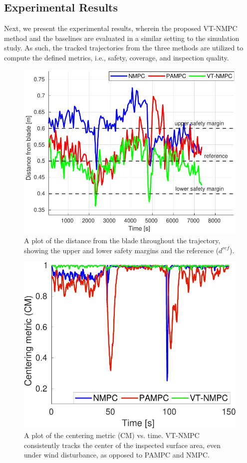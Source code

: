 \subsection{Experimental Results}

Next, we present the experimental results, wherein the proposed VT-NMPC method and the baselines are evaluated in a similar setting to the simulation study. As such, the tracked trajectories from the three methods are utilized to compute the defined metrics, i.e., safety, coverage, and inspection quality. 



\begin{figure}[]
\centering
\includegraphics[width=.45\textwidth]{figures/distance_real.pdf}
\caption{A plot of the distance from the blade throughout the trajectory, showing the upper and lower safety margins and the reference ($d^{ref}$). }  \label{fig:distance_r}
\end{figure}


\begin{figure}[]
\centering
\includegraphics[width=.45\textwidth]{figures/cm.pdf}
\caption{A plot of the centering metric (CM) vs. time. VT-NMPC consistently tracks the center of the inspected surface area, even under wind disturbance, as opposed to PAMPC and NMPC.}  \label{fig:cm_r}
\end{figure}


